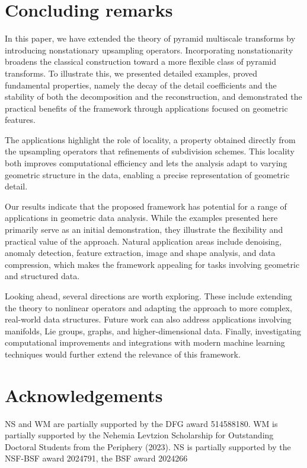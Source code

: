\documentclass[11pt,a4paper]{article}
\theoremstyle{definition}
\begin{document}

\section{Concluding remarks} \label{sec:conclusion}

In this paper, we have extended the theory of pyramid multiscale transforms by introducing nonstationary upsampling operators. Incorporating nonstationarity broadens the classical construction toward a more flexible class of pyramid transforms. To illustrate this, we presented detailed examples, proved fundamental properties, namely the decay of the detail coefficients and the stability of both the decomposition and the reconstruction, and demonstrated the practical benefits of the framework through applications focused on geometric features.

The applications highlight the role of locality, a property obtained directly from the upsampling operators that refinements of subdivision schemes. This locality both improves computational efficiency and lets the analysis adapt to varying geometric structure in the data, enabling a precise representation of geometric detail.

Our results indicate that the proposed framework has potential for a range of applications in geometric data analysis. While the examples presented here primarily serve as an initial demonstration, they illustrate the flexibility and practical value of the approach. Natural application areas include denoising, anomaly detection, feature extraction, image and shape analysis, and data compression, which makes the framework appealing for tasks involving geometric and structured data.

Looking ahead, several directions are worth exploring. These include extending the theory to nonlinear operators and adapting the approach to more complex, real-world data structures. Future work can also address applications involving manifolds, Lie groups, graphs, and higher-dimensional data. Finally, investigating computational improvements and integrations with modern machine learning techniques would further extend the relevance of this framework.


\section*{Acknowledgements}
NS and WM are partially supported by the DFG award 514588180. WM is partially supported by the Nehemia Levtzion Scholarship for Outstanding Doctoral Students from the Periphery (2023). NS is partially supported by the NSF-BSF award 2024791, the BSF award 2024266
\end{document}

